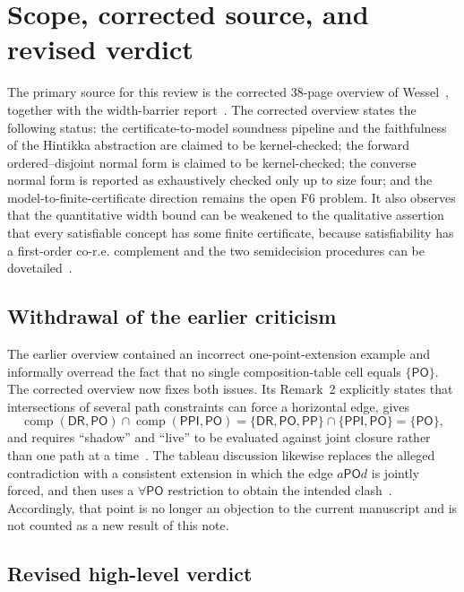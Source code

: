 \documentclass[11pt]{article}
\theoremstyle{definition}
\theoremstyle{remark}
\newcommand{\PP}{\mathsf{PP}}
\newcommand{\PPI}{\mathsf{PPI}}
\newcommand{\PO}{\mathsf{PO}}
\newcommand{\DR}{\mathsf{DR}}
\begin{document}
\tableofcontents

\section{Scope, corrected source, and revised verdict}

The primary source for this review is the corrected 38-page overview of Wessel~\cite{WesselOverviewCorrected}, together with the width-barrier report~\cite{WidthBarrier}.  The corrected overview states the following status: the certificate-to-model soundness pipeline and the faithfulness of the Hintikka abstraction are claimed to be kernel-checked; the forward ordered--disjoint normal form is claimed to be kernel-checked; the converse normal form is reported as exhaustively checked only up to size four; and the model-to-finite-certificate direction remains the open F6 problem.  It also observes that the quantitative width bound can be weakened to the qualitative assertion that every satisfiable concept has some finite certificate, because satisfiability has a first-order co-r.e. complement and the two semidecision procedures can be dovetailed~\cite[Sec.~7.5]{WesselOverviewCorrected}.

\subsection{Withdrawal of the earlier criticism}

The earlier overview contained an incorrect one-point-extension example and informally overread the fact that no single composition-table cell equals $\{\PO\}$.  The corrected overview now fixes both issues.  Its Remark~2 explicitly states that intersections of several path constraints can force a horizontal edge, gives
\[
  \operatorname{comp}(\DR,\PO)\cap \operatorname{comp}(\PPI,\PO)
  =\{\DR,\PO,\PP\}\cap\{\PPI,\PO\}=\{\PO\},
\]
and requires ``shadow'' and ``live'' to be evaluated against joint closure rather than one path at a time~\cite[pp.~6--7]{WesselOverviewCorrected}.  The tableau discussion likewise replaces the alleged contradiction with a consistent extension in which the edge $a\PO d$ is jointly forced, and then uses a $\forall\PO$ restriction to obtain the intended clash~\cite[p.~17]{WesselOverviewCorrected}.  Accordingly, that point is no longer an objection to the current manuscript and is not counted as a new result of this note.

\subsection{Revised high-level verdict}
\end{document}
